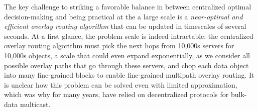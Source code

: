 
The key challenge to striking a favorable balance in \name between
centralized optimal decision-making and being practical at the
a large scale is a {\em near-optimal and efficient overlay routing
algorithm} that can be updated in timescales of several seconds.
At a first glance, the problem scale is indeed intractable:
the centralized overlay routing algorithm must pick the next hops
from 10,000s servers for 10,000s objects, a scale that could
even expand exponentially, as we consider all possible
overlay paths that go through these servers, and chop each data
object into many fine-grained blocks to enable fine-grained
multipath overlay routing.
It is unclear how this problem can be solved even with
limited approximation, which was why for many years, \company have
relied on decentralized protocols for bulk-data multicast.


